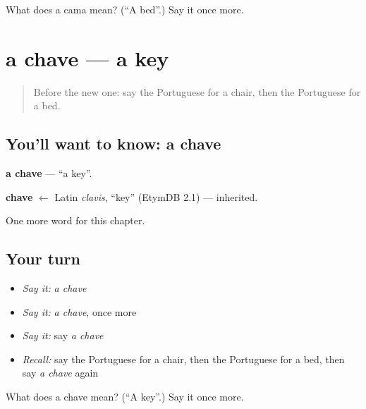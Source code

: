 \begin{tcolorbox}[breakable,colback=teal!4,colframe=teal!35!black,title={Before you move on}]
What does a cama mean? (\textquotedblleft{}A bed\textquotedblright{}.) Say it once more.
\end{tcolorbox}
\section[a chave]{a chave — a key}

\label{lesson:PT-C49-chave}



\begin{quote}
Before the new one: say the Portuguese for a chair, then the Portuguese for a bed.
\end{quote}

\subsection*{You'll want to know: a chave}
\textbf{a chave} — \textquotedblleft{}a key\textquotedblright{}.

\begin{cousinweb}
\textbf{chave} $\leftarrow$ Latin \emph{clavis}, \textquotedblleft{}key\textquotedblright{} (EtymDB 2.1) — inherited.
\end{cousinweb}

\begin{grammarlens}[title={What you've built}]
One more word for this chapter.
\end{grammarlens}

\subsection*{Your turn}
\begin{itemize}
\raggedright
  \item \emph{Say it:} \emph{a chave}
  \item \emph{Say it:} \emph{a chave}, once more
  \item \emph{Say it:} say \emph{a chave}
  \item \emph{Recall:} say the Portuguese for a chair, then the Portuguese for a bed, then say \emph{a chave} again
\end{itemize}

\begin{tcolorbox}[breakable,colback=teal!4,colframe=teal!35!black,title={Before you move on}]
What does a chave mean? (\textquotedblleft{}A key\textquotedblright{}.) Say it once more.
\end{tcolorbox}
